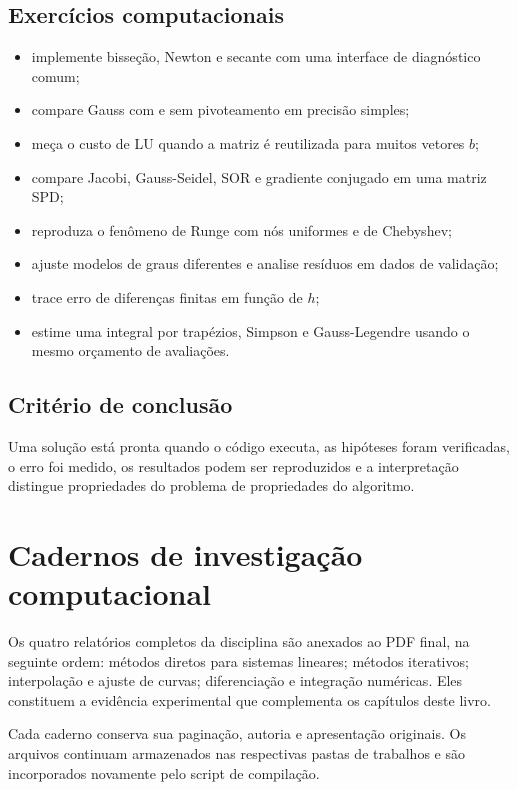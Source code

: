 \documentclass[12pt,a4paper,openany]{book}
\begin{document}
\section{Exercícios computacionais}



\begin{itemize}
\item implemente bisseção, Newton e secante com uma interface de diagnóstico comum;
\item compare Gauss com e sem pivoteamento em precisão simples;
\item meça o custo de LU quando a matriz é reutilizada para muitos vetores $b$;
\item compare Jacobi, Gauss-Seidel, SOR e gradiente conjugado em uma matriz SPD;
\item reproduza o fenômeno de Runge com nós uniformes e de Chebyshev;
\item ajuste modelos de graus diferentes e analise resíduos em dados de validação;
\item trace erro de diferenças finitas em função de $h$;
\item estime uma integral por trapézios, Simpson e Gauss-Legendre usando o mesmo orçamento de avaliações.
\end{itemize}



\section{Critério de conclusão}



Uma solução está pronta quando o código executa, as hipóteses foram verificadas, o erro foi medido, os resultados podem ser reproduzidos e a interpretação distingue propriedades do problema de propriedades do algoritmo.
\backmatter
\chapter*{Cadernos de investigação computacional}
Os quatro relatórios completos da disciplina são anexados ao PDF final, na seguinte ordem: métodos diretos para sistemas lineares; métodos iterativos; interpolação e ajuste de curvas; diferenciação e integração numéricas. Eles constituem a evidência experimental que complementa os capítulos deste livro.

Cada caderno conserva sua paginação, autoria e apresentação originais. Os arquivos continuam armazenados nas respectivas pastas de trabalhos e são incorporados novamente pelo script de compilação.
\end{document}
